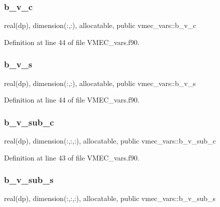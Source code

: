 \subsubsection{\texorpdfstring{b\+\_\+v\+\_\+c}{b\_v\_c}}
{\footnotesize\ttfamily real(dp), dimension(\+:,\+:), allocatable, public vmec\+\_\+vars\+::b\+\_\+v\+\_\+c}



Definition at line 44 of file V\+M\+E\+C\+\_\+vars.\+f90.

\mbox{\label{namespacevmec__vars_ab2aa43fe35401e8f2b7ffb2facad7109}} 
\subsubsection{\texorpdfstring{b\+\_\+v\+\_\+s}{b\_v\_s}}
{\footnotesize\ttfamily real(dp), dimension(\+:,\+:), allocatable, public vmec\+\_\+vars\+::b\+\_\+v\+\_\+s}



Definition at line 44 of file V\+M\+E\+C\+\_\+vars.\+f90.

\mbox{\label{namespacevmec__vars_a2e07a2b5bd2384e16e8af8ca4f5b50d6}} 
\subsubsection{\texorpdfstring{b\+\_\+v\+\_\+sub\+\_\+c}{b\_v\_sub\_c}}
{\footnotesize\ttfamily real(dp), dimension(\+:,\+:,\+:), allocatable, public vmec\+\_\+vars\+::b\+\_\+v\+\_\+sub\+\_\+c}



Definition at line 43 of file V\+M\+E\+C\+\_\+vars.\+f90.

\mbox{\label{namespacevmec__vars_aac5e249f0f14cf1e542f881d1777b730}} 
\subsubsection{\texorpdfstring{b\+\_\+v\+\_\+sub\+\_\+s}{b\_v\_sub\_s}}
{\footnotesize\ttfamily real(dp), dimension(\+:,\+:,\+:), allocatable, public vmec\+\_\+vars\+::b\+\_\+v\+\_\+sub\+\_\+s}



